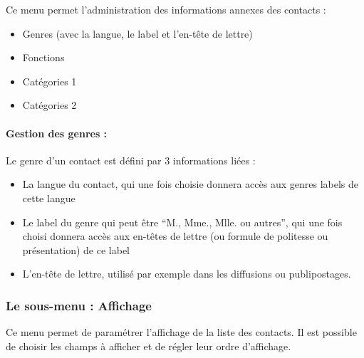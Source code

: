 Ce menu permet l'administration des informations annexes des contacts :\\

\begin{itemize}
\item Genres (avec la langue, le label et l'en-tête de lettre)
\item Fonctions
\item Catégories 1
\item Catégories 2
\end{itemize}

\paragraph{Gestion des genres : } Le genre d'un contact est défini par 3 informations liées :\\

\begin{itemize}
\item La langue du contact, qui une fois choisie donnera accès aux genres labels de cette langue
\item Le label du genre qui peut être ``M., Mme., Mlle. ou autres'', qui une fois choisi donnera accès aux en-têtes de lettre (ou formule de politesse ou présentation) de ce label 
\item L'en-tête de lettre, utilisé par exemple dans les diffusions ou publipostages.
\end{itemize}


\subsubsection{Le sous-menu : Affichage}

Ce menu permet de paramétrer l'affichage de la liste des contacts. Il est possible de choisir les champs à afficher et de régler leur ordre d'affichage.
